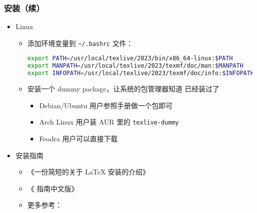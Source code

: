 \begin{frame}[fragile]
  \frametitle{安装（续）}
  \begin{itemize}
    \item Linux
          \begin{itemize}
            \item 添加环境变量到 \nolinkurl{~/.bashrc} 文件：
                  \begin{lstlisting}[language=bash]
export PATH=/usr/local/texlive/2023/bin/x86_64-linux:$PATH
export MANPATH=/usr/local/texlive/2023/texmf/doc/man:$MANPATH
export INFOPATH=/usr/local/texlive/2023/texmf/doc/info:$INFOPATH
          \end{lstlisting}
            \item 安装一个 dummy package，让系统的包管理器知道 \TL 已经装过了
                  \begin{itemize}
                    \item Debian/Ubuntu 用户参照手册做一个包即可
                    \item Arch Linux 用户装 AUR 里的 \verb|texlive-dummy|
                    \item Feodra 用户可以直接下载
                  \end{itemize}
          \end{itemize}
    \item 安装指南
          \begin{itemize}
            \item 《一份简短的关于 \LaTeX{} 安装的介绍》
            \item 《\TL{} 指南中文版》
            \item 更多参考：
          \end{itemize}
  \end{itemize}
\end{frame}


